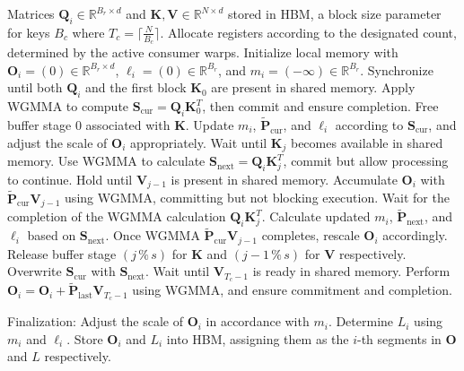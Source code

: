 \begin{algorithm}[H]
    \caption{\small\label{alg:flash3_wgmma}\textsc{FlashAttention-3} consumer warpgroup forward pass}
    \begin{algorithmic}[1]
      \REQUIRE  Matrices $\mathbf{Q}_i \in \mathbb{R}^{B_r \times d}$ and $\mathbf{K}, \mathbf{V} \in \mathbb{R}^{N \times d}$ stored in HBM, a block size parameter for keys $B_c$ where $T_c = \lceil \frac{N}{B_c} \rceil$.
      \STATE Allocate registers according to the designated count, determined by the active consumer warps.
      \STATE Initialize local memory with $\mathbf{O}_i = (0) \in \mathbb{R}^{B_r \times d}$, $\ell_i = (0) \in \mathbb{R}^{B_r}$, and $m_i = (-\infty) \in \mathbb{R}^{B_r}$.
      \STATE Synchronize until both $\mathbf{Q}_i$ and the first block $\mathbf{K}_0$ are present in shared memory.
      \STATE Apply WGMMA to compute $\mathbf{S}_{\mathrm{cur}} = \mathbf{Q}_i \mathbf{K}_0^T$, then commit and ensure completion.
      \STATE Free buffer stage 0 associated with $\mathbf{K}$.
      \STATE Update $m_i$, $\tilde{\mathbf{P}}_{\mathrm{cur}}$, and $\ell_i$ according to $\mathbf{S}_{\mathrm{cur}}$, and adjust the scale of $\mathbf{O}_i$ appropriately.
        \STATE Wait until $\mathbf{K}_j$ becomes available in shared memory.
        \label{code:mainloop_start}
        \STATE Use WGMMA to calculate $\mathbf{S}_{\mathrm{next}} = \mathbf{Q}_i \mathbf{K}_{j}^T$, commit but allow processing to continue. \label{code:first_wgmma}
        \STATE Hold until $\mathbf{V}_{j-1}$ is present in shared memory.
        \STATE Accumulate $\mathbf{O}_{i}$ with $\tilde{\mathbf{P}}_{\mathrm{cur}} \mathbf{V}_{j-1}$ using WGMMA, committing but not blocking execution. \label{code:second_wgmma}
        \STATE Wait for the completion of the WGMMA calculation $\mathbf{Q}_i \mathbf{K}_{j}^T$.
        \STATE Calculate updated $m_{i}$, $\tilde{\mathbf{P}}_{\mathrm{next}}$, and $\ell_{i}$ based on $\mathbf{S}_{\mathrm{next}}$. \label{code:softmax}
        \STATE Once WGMMA $\tilde{\mathbf{P}}_{\mathrm{cur}} \mathbf{V}_{j-1}$ completes, rescale $\mathbf{O}_i$ accordingly.
        \STATE Release buffer stage $(j\,\%\,s)$ for $\mathbf{K}$ and $(j-1\,\%\,s)$ for $\mathbf{V}$ respectively.
        \STATE Overwrite $\mathbf{S}_{\mathrm{cur}}$ with $\mathbf{S}_{\mathrm{next}}$.
        \label{code:mainloop_end}
      \ENDFOR \STATE Wait until $\mathbf{V}_{T_c - 1}$ is ready in shared memory.
      \STATE Perform
      $\mathbf{O}_{i} = \mathbf{O}_{i} + \tilde{\mathbf{P}}_{\mathrm{last}} \mathbf{V}_{T_c - 1}$ using WGMMA, and ensure commitment and completion.

\STATE Finalization: Adjust the scale of $\mathbf{O}_{i}$ in accordance with $m_{i}$. Determine $L_{i}$ using $m_{i}$ and $\ell_{i}$.  
Store $\mathbf{O}_{i}$ and $L_{i}$ into HBM, assigning them as the $i$-th segments in $\mathbf{O}$ and $L$ respectively.  
\end{algorithmic}
\end{algorithm}

